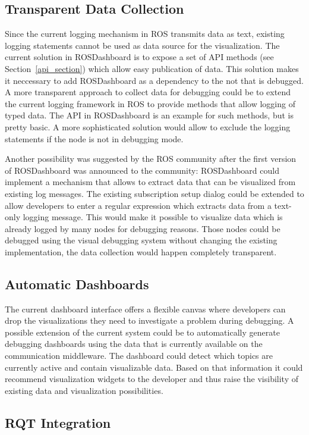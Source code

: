 \subsection{Transparent Data Collection}
Since the current logging mechanism in ROS transmits data as text, existing logging statements cannot be used as data source for the visualization. The current solution in ROSDashboard is to expose a set of API methods (see Section~\ref{api_section}) which allow easy publication of data. This solution makes it neccessary to add ROSDashboard as a dependency to the not that is debugged. A more transparent approach to collect data for debugging could be to extend the current logging framework in ROS to provide methods that allow logging of typed data. The API in ROSDashboard is an example for such methods, but is pretty basic. A more sophisticated solution would allow to exclude the logging statements if the node is not in debugging mode.

Another possibility was suggested by the ROS community after the first version of ROSDashboard was announced to the community: ROSDashboard could implement a mechanism that allows to extract data that can be visualized from existing log messages. The existing subscription setup dialog could be extended to allow developers to enter a regular expression which extracts data from a text-only logging message. This would make it possible to visualize data which is already logged by many nodes for debugging reasons. Those nodes could be debugged using the visual debugging system without changing the existing implementation, the data collection would happen completely transparent.

\subsection{Automatic Dashboards}
The current dashboard interface offers a flexible canvas where developers can drop the visualizations they need to investigate a problem during debugging. A possible extension of the current system could be to automatically generate debugging dashboards using the data that is currently available on the communication middleware. The dashboard could detect which topics are currently active and contain visualizable data. Based on that information it could recommend visualization widgets to the developer and thus raise the visibility of existing data and visualization possibilities.

\subsection{RQT Integration}

